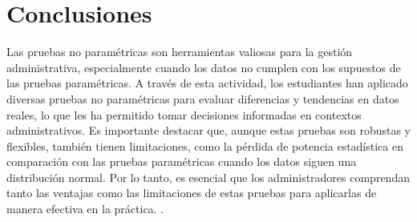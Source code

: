 {\section{Conclusiones}
Las pruebas no paramétricas son herramientas valiosas para la gestión administrativa, especialmente cuando los datos no cumplen con los supuestos de las pruebas paramétricas. A través de esta actividad, los estudiantes han aplicado diversas pruebas no paramétricas para evaluar diferencias y tendencias en datos reales, lo que les ha permitido tomar decisiones informadas en contextos administrativos. Es importante destacar que, aunque estas pruebas son robustas y flexibles, también tienen limitaciones, como la pérdida de potencia estadística en comparación con las pruebas paramétricas cuando los datos siguen una distribución normal. Por lo tanto, es esencial que los administradores comprendan tanto las ventajas como las limitaciones de estas pruebas para aplicarlas de manera efectiva en la práctica. \citep{anderson2012,lind2012,wackerly2010,diazRodriguez2022}.
}

